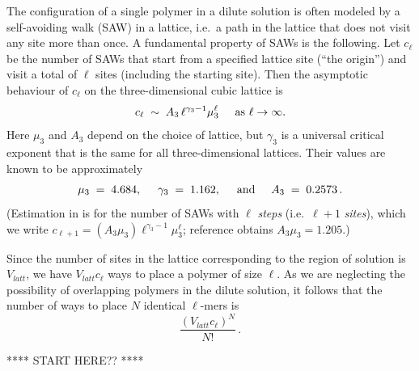 \documentclass[journal=mamobx,manuscript=article]{achemso}
\begin{document}
The configuration of a single  polymer in a dilute solution is often modeled by
a self-avoiding walk (SAW) in a lattice, i.e.\  a path in the lattice that does not visit any site more than once.
A fundamental property of SAWs is the following.  
Let $c_{\ell}$ be
the number of SAWs that start from a specified lattice site (``the origin'') and visit a total of $\ell$ sites
(including the starting site).   Then the 
asymptotic behaviour of $c_{\ell}$ on the three-dimensional cubic lattice is 
\begin{equation}
    \label{eq.sawscale}
       c_{\ell}  \;\sim  \;  A_3 \, {\ell}^{\gamma_3-1}  \mu_3^{\ell}    \hspace{5mm}\hbox{as $\ell\rightarrow\infty$}.
\end{equation}
Here $\mu_3$ and $A_3$ depend on the choice of lattice, but $\gamma_3$ is a universal critical exponent
that is the same for all three-dimensional lattices.  
Their values are known to be approximately \cite{Chen2002,Madras2013}
\begin{equation}
   \label{eq.gammas}   \mu_3 \;=\;  4.684, \hspace{5mm}
        \gamma_3 \;=\;  1.162,    \hspace{5mm}\hbox{and}\hspace{5mm}
    A_3  \;=\;    0.2573  \,.  %
\end{equation}
(Estimation in \cite{Chen2002} is for the 
number of SAWs with $\ell$ \textit{steps} (i.e.\ $\ell+1$ \textit{sites}), which we write  $c_{\ell+1}=(A_3\mu_3)\ell^{\gamma_3-1}\mu_3^{\ell}$; reference \cite{Chen2002} obtains $A_3\mu_3=1.205$.)

Since the number of sites in the lattice corresponding to the region of solution is $V_{latt}$, 
we have $V_{latt}c_{\ell}$ ways to place a polymer of size ${\ell}$.  As we are neglecting the
possibility of overlapping polymers in the dilute solution, it follows that the number of ways to 
place $N$ identical $\ell$-mers is 
\begin{equation}
  \label{eq.Npoly}
   \frac{(V_{latt}c_{\ell})^N}{N!}  \,.   
\end{equation}

\smallskip

****  START HERE?? ****

\medskip
\end{document}
